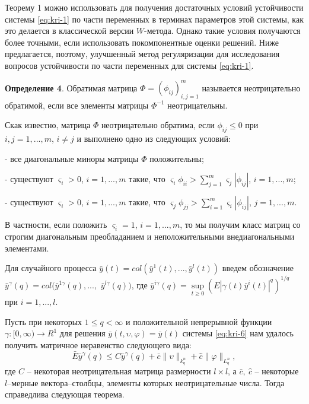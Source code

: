 Теорему 1 можно использовать для получения достаточных условий
устойчивости системы \eqref{eq:kri-1} по части переменных в терминах параметров
этой системы, как это делается в классической версии $W$-метода.
Однако такие условия получаются более точными, если использовать
покомпонентные оценки решений. Ниже предлагается, поэтому,
улучшенный метод регуляризации для исследования вопросов
устойчивости по части переменных для системы \eqref{eq:kri-1}.

\textbf {Определение 4}. Обратимая матрица $\Phi =
(\phi_{ij})^m_{i,j=1}$ называется неотрицательно обратимой, если все
элементы матрицы $\Phi^{-1}$ неотрицательны.

Скак известно, матрица $\Phi$ неотрицательно обратима, если
$\phi_{ij} \leq 0$ при $i, j = 1,...,m$, $i\neq j$ и выполнено одно
из следующих условий:

- все диагональные миноры матрицы $\Phi$ положительны;

- существуют $\varsigma _i > 0$, $i = 1,...,m$ такие, что
$\varsigma_i \phi_{ii} > \sum \limits _{j=1}^m \varsigma_j
|\phi_{ij}|$, $i = 1,...,m$;

- существуют $\varsigma _i>0$, $i = 1,...,m$ такие, что $\varsigma_j
\phi_{jj} > \sum \limits _{i=1}^m\varsigma_i |\phi_{ij}|$, $j =
1,...,m$.

В частности, если положить $\varsigma _i = 1$, $i = 1,...,m$, то мы
получим класс матриц со строгим диагональным преобладанием и
неположительными внедиагональными элементами.

Для случайного процесса $\bar y(t) = col(\bar y^1(t),..., \bar
y^l(t))$ введем обозначение $ \bar y^\gamma (q) = col (\bar
y^{1\gamma }(q),...,$ $\bar y^{l\gamma }(q))$, где $\bar y^{i\gamma
}(q) = \sup \limits _{t \geq 0}\left (E|\gamma (t) \bar
y^i(t)|^{q}\right )^{1/q}$ при $i = 1,...,l$.

Пусть при некоторых $1\le q < \infty $ и положительной непрерывной
функции $\gamma :[0, \infty) \rightarrow R^1 $ для решения $\bar
y(t,\upsilon,\varphi) =  \bar y(t)$ системы \eqref{eq:kri-6} нам удалось
получить матричное неравенство следующего вида:
\begin{equation}
    \label{eq:kri-9}
    \bar E\bar y^\gamma (q) \leq C\bar y^\gamma (q) + \bar
    c\|\upsilon\|_{k^n_{q}} + \hat c \|\varphi \|_{L^n_q} ,
\end{equation}
где $C$ -- некоторая неотрицательная матрица размерности $l\times
l$, а $\bar c, \ \hat c$ -- некоторые $l$--мерные вектора--столбцы,
элементы которых неотрицательные числа. Тогда справедлива следующая
теорема.

